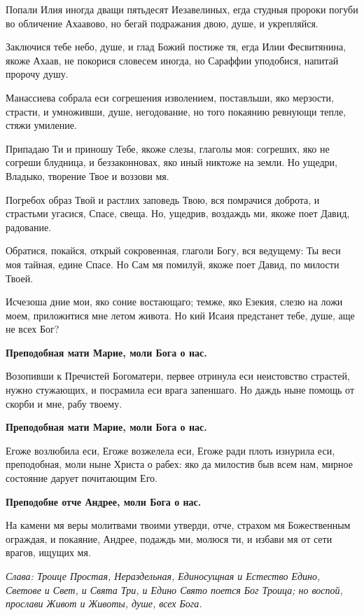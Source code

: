 Попали Илия иногда дващи пятьдесят Иезавелиных, егда студныя пророки погуби во обличение Ахаавово, но бегай подражания двою, душе, и укрепляйся.


Заключися тебе небо, душе, и глад Божий постиже тя, егда Илии Фесвитянина, якоже Ахаав, не покорися словесем иногда, но Сараффии уподобися, напитай пророчу душу.


Манассиева собрала еси согрешения изволением, поставльши, яко мерзости, страсти, и умноживши, душе, негодование, но того покаянию ревнующи тепле, стяжи умиление.


Припадаю Ти и приношу Тебе, якоже слезы, глаголы моя: согреших, яко не согреши блудница, и беззаконновах, яко иный никтоже на земли. Но ущедри, Владыко, творение Твое и воззови мя.


Погребох образ Твой и растлих заповедь Твою, вся помрачися доброта, и страстьми угасися, Спасе, свеща. Но, ущедрив, воздаждь ми, якоже поет Давид, радование.


Обратися, покайся, открый сокровенная, глаголи Богу, вся ведущему: Ты веси моя тайная, едине Спасе. Но Сам мя помилуй, якоже поет Давид, по милости Твоей.


Исчезоша дние мои, яко соние востающаго; темже, яко Езекия, слезю на ложи моем, приложитися мне летом живота. Но кий Исаия предстанет тебе, душе, аще не всех Бог?


\bfseries Преподобная мати Марие, моли Бога о нас.\normalfont{}


Возопивши к Пречистей Богоматери, первее отринула еси неистовство страстей, нужно стужающих, и посрамила еси врага запеншаго. Но даждь ныне помощь от скорби и мне, рабу твоему.


\bfseries Преподобная мати Марие, моли Бога о нас.\normalfont{}


Егоже возлюбила еси, Егоже возжелела еси, Егоже ради плоть изнурила еси, преподобная, моли ныне Христа о рабех: яко да милостив быв всем нам, мирное состояние дарует почитающим Его.


\bfseries Преподобне отче Андрее, моли Бога о нас.\normalfont{}


На камени мя веры молитвами твоими утверди, отче, страхом мя Божественным ограждая, и покаяние, Андрее, подаждь ми, молюся ти, и избави мя от сети врагов, ищущих мя.


\itshape Слава\normalfont{}: Троице Простая, Нераздельная, Единосущная и Естество Едино, Светове и Свет, и Свята Три, и Едино Свято поется Бог Троица; но воспой, прослави Живот и Животы, душе, всех Бога.


